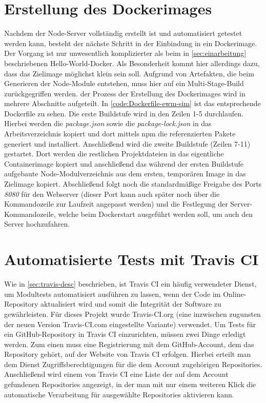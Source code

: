 \section{Erstellung des Dockerimages}
Nachdem der Node-Server vollständig erstellt ist und automatisiert getestet werden kann, besteht der nächste Schritt in der Einbindung in ein Dockerimage.
Der Vorgang ist nur unwesentlich komplizierter als beim in \autoref{sec:einarbeitung} beschriebenen Hello-World-Docker.
Als Besonderheit kommt hier allerdings dazu, dass das Zielimage möglichst klein sein soll.
Aufgrund von Artefakten, die beim Generieren der Node-Module entstehen, muss hier auf ein Multi-Stage-Build zurückgegriffen werden.
\Dash der Prozess der Erstellung des Dockerimages wird in mehrere Abschnitte aufgeteilt.
In \autoref{code:Dockerfile-ewm-sim} ist das entsprechende Dockerfile zu sehen.
Die erste Buildstufe wird in den Zeilen 1-5 durchlaufen.
Hierbei werden die \emph{package.json} sowie die \emph{package-lock.json} in das Arbeitsverzeichnis kopiert und dort mittels \ac{npm} die referenzierten Pakete generiert und installiert.
Anschließend wird die zweite Buildstufe (Zeilen 7-11) gestartet.
Dort werden die restlichen Projektdateien in das eigentliche Containerimage kopiert und anschließend das während der ersten Buildstufe aufgebaute Node-Modulverzeichnis aus dem ersten, temporären Image in das Zielimage kopiert.
Abschließend folgt noch die standardmäßige Freigabe des Ports \emph{8080} für den Webserver (dieser Port kann auch später noch über die Kommandozeile zur Laufzeit angepasst werden) und die Festlegung der Server-Kommandozeile, welche beim Dockerstart ausgeführt werden soll, um auch den Server hochzufahren.




\section{Automatisierte Tests mit Travis CI}
Wie in \autoref{sec:travis-desc} beschrieben, ist Travis CI ein häufig verwendeter Dienst, um Modultests automatisiert ausführen zu lassen, wenn der Code im Online-Repository aktualisiert wird und somit die Integrität der Software zu gewährleisten.
Für dieses Projekt wurde Travis-CI.org (eine inzwischen zugunsten der neuen Version Travis-CI.com eingestellte Variante) verwendet.
Um Tests für ein GitHub-Repository in Travis CI einzurichten, müssen zwei Dinge erledigt werden.
Zum einen muss eine Registrierung mit dem GitHub-Account, dem das Repository gehört, auf der Website von Travis CI erfolgen.
Hierbei erteilt man dem Dienst Zugriffsberechtigungen für die dem Account zugehörigen Repositories.
Anschließend wird einem von Travis CI eine Liste der auf dem Account gefundenen Repositories angezeigt, in der man mit nur einem weiteren Klick die automatische Verarbeitung für ausgewählte Repositories aktivieren kann.

